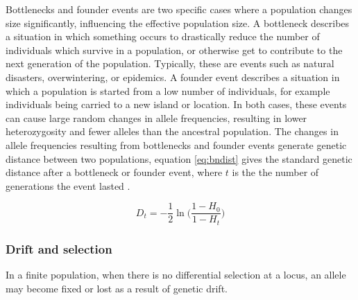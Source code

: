 Bottlenecks and founder events are two specific cases where a population changes size significantly, influencing the effective population size.
A bottleneck describes a situation in which something occurs to drastically reduce the number of individuals which survive in a population, or otherwise get to contribute to the next generation of the population.
Typically, these are events such as natural disasters, overwintering, or epidemics.
A founder event describes a situation in which a population is started from a low number of individuals, for example individuals being carried to a new island or location.
In both cases, these events can cause large random changes in allele frequencies, resulting in lower heterozygosity and fewer alleles than the ancestral population.
The changes in allele frequencies resulting from bottlenecks and founder events generate genetic distance between two populations, equation \ref{eq:bndist} gives the standard genetic distance \parencite{Nei1987} after a bottleneck or founder event, where $t$ is the the number of generations the event lasted \parencite{Chakraborty1977}.

\begin{equation}
D_t = -\frac{1}{2}\ln\bigg(\frac{1-H_0}{1-H_t}\bigg)
\label{eq:bndist}
\end{equation}

\subsubsection{Drift and selection}

In a finite population, when there is no differential selection at a locus, an allele may become fixed or lost as a result of genetic drift.

